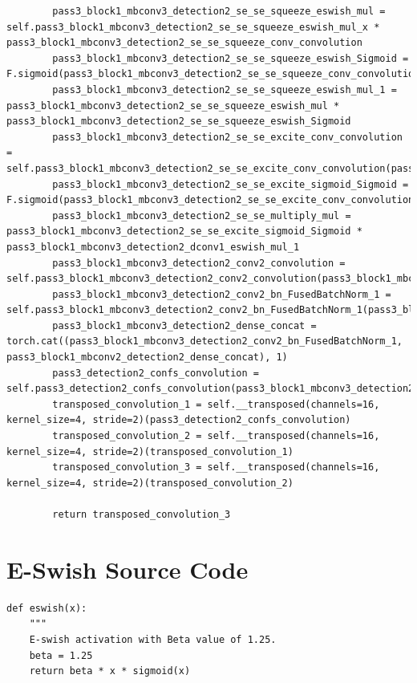 \documentclass{fisatprojectfinal}
\begin{document}
\begin{appendices}
\begin{lstlisting}
        pass3_block1_mbconv3_detection2_se_se_squeeze_eswish_mul = self.pass3_block1_mbconv3_detection2_se_se_squeeze_eswish_mul_x * pass3_block1_mbconv3_detection2_se_se_squeeze_conv_convolution
        pass3_block1_mbconv3_detection2_se_se_squeeze_eswish_Sigmoid = F.sigmoid(pass3_block1_mbconv3_detection2_se_se_squeeze_conv_convolution)
        pass3_block1_mbconv3_detection2_se_se_squeeze_eswish_mul_1 = pass3_block1_mbconv3_detection2_se_se_squeeze_eswish_mul * pass3_block1_mbconv3_detection2_se_se_squeeze_eswish_Sigmoid
        pass3_block1_mbconv3_detection2_se_se_excite_conv_convolution = self.pass3_block1_mbconv3_detection2_se_se_excite_conv_convolution(pass3_block1_mbconv3_detection2_se_se_squeeze_eswish_mul_1)
        pass3_block1_mbconv3_detection2_se_se_excite_sigmoid_Sigmoid = F.sigmoid(pass3_block1_mbconv3_detection2_se_se_excite_conv_convolution)
        pass3_block1_mbconv3_detection2_se_se_multiply_mul = pass3_block1_mbconv3_detection2_se_se_excite_sigmoid_Sigmoid * pass3_block1_mbconv3_detection2_dconv1_eswish_mul_1
        pass3_block1_mbconv3_detection2_conv2_convolution = self.pass3_block1_mbconv3_detection2_conv2_convolution(pass3_block1_mbconv3_detection2_se_se_multiply_mul)
        pass3_block1_mbconv3_detection2_conv2_bn_FusedBatchNorm_1 = self.pass3_block1_mbconv3_detection2_conv2_bn_FusedBatchNorm_1(pass3_block1_mbconv3_detection2_conv2_convolution)
        pass3_block1_mbconv3_detection2_dense_concat = torch.cat((pass3_block1_mbconv3_detection2_conv2_bn_FusedBatchNorm_1, pass3_block1_mbconv2_detection2_dense_concat), 1)
        pass3_detection2_confs_convolution = self.pass3_detection2_confs_convolution(pass3_block1_mbconv3_detection2_dense_concat)
        transposed_convolution_1 = self.__transposed(channels=16, kernel_size=4, stride=2)(pass3_detection2_confs_convolution)
        transposed_convolution_2 = self.__transposed(channels=16, kernel_size=4, stride=2)(transposed_convolution_1)
        transposed_convolution_3 = self.__transposed(channels=16, kernel_size=4, stride=2)(transposed_convolution_2)
        
        return transposed_convolution_3
	\end{lstlisting}
	\section{E-Swish Source Code}
	\begin{lstlisting}
def eswish(x):
    """
    E-swish activation with Beta value of 1.25.
    beta = 1.25
    return beta * x * sigmoid(x)
	\end{lstlisting}

\end{appendices}
\end{document}
